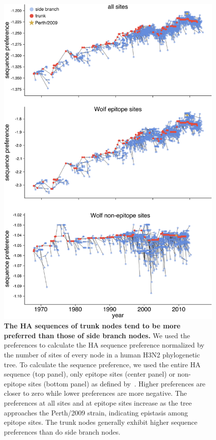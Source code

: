 \documentclass[9pt,twocolumn,twoside]{pnas-new}
\begin{document}
\begin{figure}
\centering
\includegraphics[width=12cm]{figs/sequence_preference/sequence_preference.pdf}
\caption{\label{fig:sequence_preference}
{\bf The HA sequences of trunk nodes tend to be more preferred than those of side branch nodes.}
We used the preferences to calculate the HA sequence preference normalized by the number of sites of every node in a human H3N2 phylogenetic tree.
To calculate the sequence preference, we used the entire HA sequence (top panel), only epitope sites (center panel) or non-epitope sites (bottom panel) as defined by~\cite{wolf2006long}.
Higher preferences are closer to zero while lower preferences are more negative.
The preferences at all sites and at epitope sites increase as the tree approaches the Perth/2009 strain, indicating epistasis among epitope sites.
The trunk nodes generally exhibit higher sequence preferences than do side branch nodes.
}
\end{figure}
\end{document}
